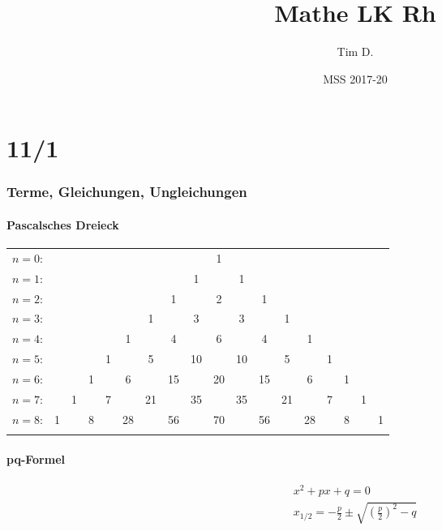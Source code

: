 



\title{Mathe LK Rh}
\author{Tim D.}
\date{MSS 2017-20}
\maketitle

\tableofcontents
\newpage  

\part{11/1}

\section{Terme, Gleichungen, Ungleichungen}

\subsection{Pascalsches Dreieck}
\begin{tabular}{rccccccccccccccccc}
  $n=0$:&    &    &    &    &    &    &    &    &  1\\\noalign{\smallskip\smallskip}
  $n=1$:&    &    &    &    &    &    &    &  1 &    &  1\\\noalign{\smallskip\smallskip}
  $n=2$:&    &    &    &    &    &    &  1 &    &  2 &    &  1\\\noalign{\smallskip\smallskip}
  $n=3$:&    &    &    &    &    &  1 &    &  3 &    &  3 &    &  1\\\noalign{\smallskip\smallskip}
  $n=4$:&    &    &    &    &  1 &    &  4 &    &  6 &    &  4 &    &  1\\\noalign{\smallskip\smallskip}
  $n=5$:&    &    &    &  1 &    &  5 &    & 10 &    & 10 &    &  5 &    &  1\\\noalign{\smallskip\smallskip}
  $n=6$:&    &    &  1 &    &  6 &    & 15 &    & 20 &    & 15 &    &  6 &    &  1\\\noalign{\smallskip\smallskip}
  $n=7$:&    &  1 &    &  7 &    & 21 &    & 35 &    & 35 &    & 21 &    &  7 &    &  1\\\noalign{\smallskip\smallskip}
  $n=8$:&  1 &    &  8 &    & 28 &    & 56 &    & 70 &    & 56 &    & 28 &    &  8 &    &  1\\\noalign{\smallskip\smallskip}
\end{tabular}

\subsection{pq-Formel}
\begin{gather*}
  x^2 + px + q = 0 \\
  x_{1/2} = -\frac{p}{2} \pm \sqrt{(\frac{p}{2})^2 - q}
\end{gather*}

